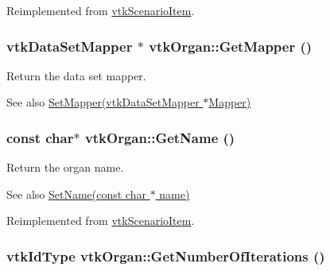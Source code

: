 Reimplemented from \hyperlink{classvtkScenarioItem_a9884061bd42ee058291d95a67ddcac20}{vtkScenarioItem}.\hypertarget{classvtkOrgan_af638d5ed23ec53237ec15089ef5cbadc}{
\subsubsection[{GetMapper}]{\setlength{\rightskip}{0pt plus 5cm}vtkDataSetMapper $\ast$ vtkOrgan::GetMapper ()}}
\label{classvtkOrgan_af638d5ed23ec53237ec15089ef5cbadc}


Return the data set mapper. \begin{DoxySeeAlso}{See also}
\hyperlink{classvtkOrgan_aefdce585f74966627c2b5c9d01be8fe3}{SetMapper(vtkDataSetMapper $\ast$Mapper)} 
\end{DoxySeeAlso}
\hypertarget{classvtkOrgan_a8421389b02b00b42b0899b75d00633b4}{
\subsubsection[{GetName}]{\setlength{\rightskip}{0pt plus 5cm}const char$\ast$ vtkOrgan::GetName ()}}
\label{classvtkOrgan_a8421389b02b00b42b0899b75d00633b4}


Return the organ name. \begin{DoxySeeAlso}{See also}
\hyperlink{classvtkOrgan_a55ca17e15fea6a6c1672f8b271546e6b}{SetName(const char $\ast$ name)} 
\end{DoxySeeAlso}


Reimplemented from \hyperlink{classvtkScenarioItem_a41ebb204b2879d9dd14a392c1cb3c2fe}{vtkScenarioItem}.\hypertarget{classvtkOrgan_a99aeadb34310d5ad8b7d8616ea8482ef}{
\subsubsection[{GetNumberOfIterations}]{\setlength{\rightskip}{0pt plus 5cm}vtkIdType vtkOrgan::GetNumberOfIterations ()}}
\label{classvtkOrgan_a99aeadb34310d5ad8b7d8616ea8482ef}


